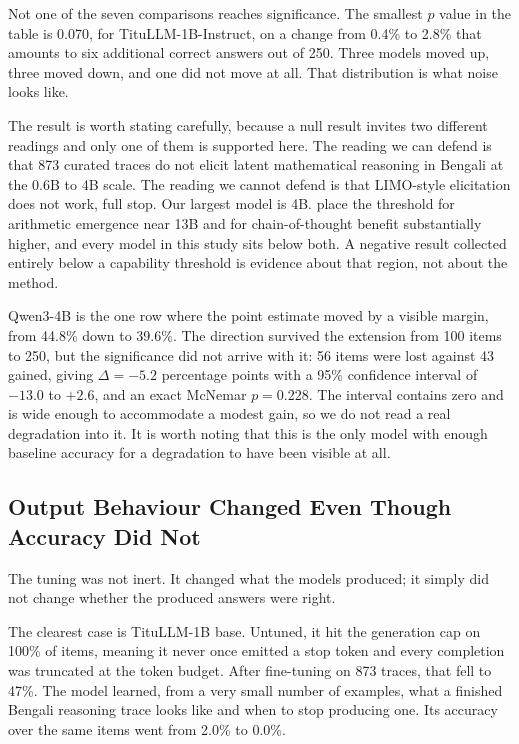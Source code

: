 \documentclass[10pt,twocolumn,letterpaper]{article}
\begin{document}
Not one of the seven comparisons reaches significance. The smallest $p$ value in
the table is 0.070, for TituLLM-1B-Instruct, on a change from 0.4\% to 2.8\%
that amounts to six additional correct answers out of 250. Three models moved
up, three moved down, and one did not move at all. That distribution is what
noise looks like.

The result is worth stating carefully, because a null result invites two
different readings and only one of them is supported here. The reading we can
defend is that 873 curated traces do not elicit latent mathematical reasoning
in Bengali at the 0.6B to 4B scale. The reading we cannot defend is that
LIMO-style elicitation does not work, full stop. Our largest model is 4B.
\textcite{wei2022emergent} place the threshold for arithmetic emergence near
13B and for chain-of-thought benefit substantially higher, and every model in
this study sits below both. A negative result collected entirely below a
capability threshold is evidence about that region, not about the method.

Qwen3-4B is the one row where the point estimate moved by a visible margin, from
44.8\% down to 39.6\%. The direction survived the extension from 100 items to
250, but the significance did not arrive with it: 56 items were lost against 43
gained, giving $\Delta = -5.2$ percentage points with a 95\% confidence interval
of $-13.0$ to $+2.6$, and an exact McNemar $p=0.228$. The interval contains zero
and is wide enough to accommodate a modest gain, so we do not read a real
degradation into it. It is worth noting that this is the only model with
enough baseline accuracy for a degradation to have been visible at all.

\subsection{Output Behaviour Changed Even Though Accuracy Did Not}
\label{sec:behaviour}

The tuning was not inert. It changed what the models produced; it simply did not
change whether the produced answers were right.

The clearest case is TituLLM-1B base. Untuned, it hit the generation cap on
100\% of items, meaning it never once emitted a stop token and every completion
was truncated at the token budget. After fine-tuning on 873 traces, that fell to
47\%. The model learned, from a very small number of examples, what a finished
Bengali reasoning trace looks like and when to stop producing one. Its accuracy
over the same items went from 2.0\% to 0.0\%.
\end{document}

